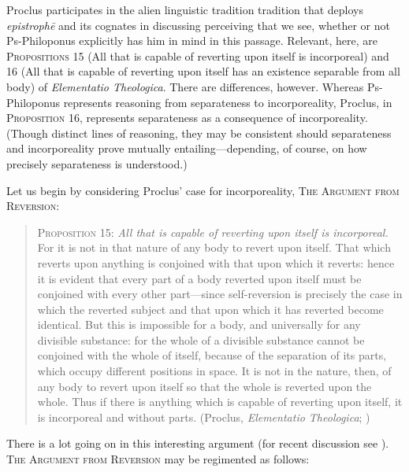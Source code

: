 Proclus participates in the alien linguistic tradition tradition that deploys \emph{epistrophē} and its cognates in discussing perceiving that we see, whether or not Ps-Philoponus explicitly has him in mind in this passage. Relevant, here, are \textsc{Propositions} 15 (All that is capable of reverting upon itself is incorporeal) and 16 (All that is capable of reverting upon itself has an existence separable from all body) of \emph{Elementatio Theologica}. There are differences, however. Whereas Ps-Philoponus represents reasoning from separateness to incorporeality, Proclus, in \textsc{Proposition} 16, represents separateness as a consequence of incorporeality. (Though distinct lines of reasoning, they may be consistent should separateness and incorporeality prove mutually entailing—depending, of course, on how precisely separateness is understood.)

Let us begin by considering Proclus' case for incorporeality, \textsc{The Argument from Reversion}:
\begin{quote}
	\textsc{Proposition} 15: \emph{All that is capable of reverting upon itself is incorporeal.} For it is not in that nature of any body to revert upon itself. That which reverts upon anything is conjoined with that upon which it reverts: hence it is evident that every part of a body reverted upon itself must be conjoined with every other part—since self-reversion is precisely the case in which the reverted subject and that upon which it has reverted become identical. But this is impossible for a body, and universally for any divisible substance: for the whole of a divisible substance cannot be conjoined with the whole of itself, because of the separation of its parts, which occupy different positions in space. It is not in the nature, then, of any body to revert upon itself so that the whole is reverted upon the whole. Thus if there is anything which is capable of reverting upon itself, it is incorporeal and without parts. (Proclus, \emph{Elementatio Theologica}; \citealt[19]{Dodds:1963ul})
\end{quote}

There is a lot going on in this interesting argument (for recent discussion see \citealt[chapter 7.4]{Coope:2020aa}). \textsc{The Argument from Reversion} may be regimented as follows:


